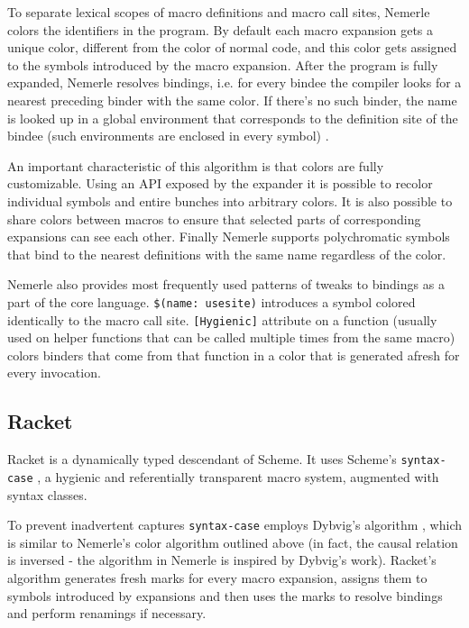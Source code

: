 \documentclass[10pt,journal,a4paper]{IEEEtran}
\begin{document}
To separate lexical scopes of macro definitions and macro call sites, Nemerle colors the
identifiers in the program. By default each macro expansion gets a unique color, different from
the color of normal code, and this color gets assigned to the symbols introduced by the macro expansion.
After the program
is fully expanded, Nemerle resolves bindings, i.e. for every bindee the compiler looks for
a nearest preceding binder with the same color.
If there's no such binder, the name is looked up
in a global environment that corresponds to the definition site of the bindee (such environments
are enclosed in every symbol) \cite{skalski04}.

An important characteristic of this algorithm is that colors are fully customizable.
Using an API exposed by the expander it is possible to recolor individual symbols and
entire bunches into arbitrary colors. It is also possible to share colors between macros
to ensure that selected parts of corresponding expansions can see each other.
Finally Nemerle supports polychromatic symbols that bind
to the nearest definitions with the same name regardless of the color.

Nemerle also provides most frequently used patterns of tweaks to bindings as a part of the core language.
\small \texttt{\$(name:~usesite)} \normalsize introduces a symbol colored identically to the macro call site.
\small \texttt{[Hygienic]} \normalsize attribute on a function (usually used on helper functions that can be
called multiple times from the same macro) colors binders that come from that function in a color that
is generated afresh for every invocation.

\subsection{Racket}

Racket is a dynamically typed descendant of Scheme.
It uses Scheme's \small \texttt{syntax-case} \normalsize, a hygienic and referentially
transparent macro system, augmented with syntax classes.

To prevent inadvertent captures \small \texttt{syntax-case} \normalsize employs Dybvig's algorithm
\cite{dybvig92},
which is similar to Nemerle's color algorithm outlined above (in fact, the causal relation is inversed -
the algorithm in Nemerle is inspired by Dybvig's work). Racket's algorithm generates fresh marks for
every macro expansion, assigns them to symbols introduced by expansions and then uses the marks to
resolve bindings and perform renamings if necessary.
\end{document}
